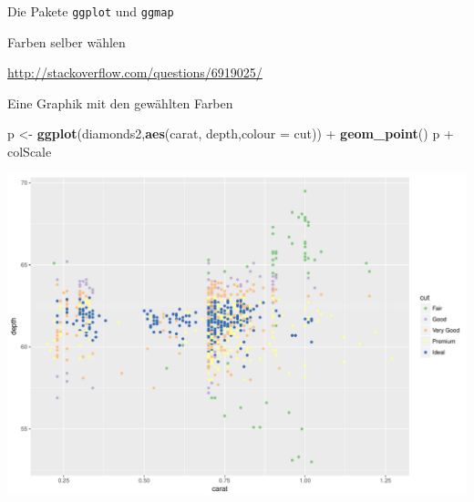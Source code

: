 \documentclass[ignorenonframetext,]{beamer}
\newenvironment{Shaded}{}{}
\newcommand{\KeywordTok}[1]{\textcolor[rgb]{0.00,0.44,0.13}{\textbf{{#1}}}}
\newcommand{\DataTypeTok}[1]{\textcolor[rgb]{0.56,0.13,0.00}{{#1}}}
\newcommand{\DecValTok}[1]{\textcolor[rgb]{0.25,0.63,0.44}{{#1}}}
\newcommand{\StringTok}[1]{\textcolor[rgb]{0.25,0.44,0.63}{{#1}}}
\newcommand{\NormalTok}[1]{{#1}}
\begin{document}
\begin{frame}[fragile]{Die Pakete \texttt{ggplot} und \texttt{ggmap}}
\begin{block}{Farben selber wählen}
\begin{Shaded}
\end{Shaded}

\url{http://stackoverflow.com/questions/6919025/}

\end{block}

\begin{block}{Eine Graphik mit den gewählten Farben}

\begin{Shaded}
\begin{Highlighting}[]
\NormalTok{p <-}\StringTok{ }\KeywordTok{ggplot}\NormalTok{(diamonds2,}\KeywordTok{aes}\NormalTok{(carat, depth,}\DataTypeTok{colour =} \NormalTok{cut)) +}\StringTok{ }
\StringTok{  }\KeywordTok{geom_point}\NormalTok{()}
\NormalTok{p +}\StringTok{ }\NormalTok{colScale}
\end{Highlighting}
\end{Shaded}

\includegraphics{R_intern_files/figure-beamer/unnamed-chunk-248-1.pdf}


\end{block}
\end{frame}
\end{document}
